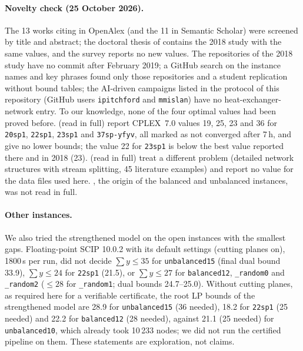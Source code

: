 \documentclass[11pt,a4paper]{report}
\newcommand*{\inst}[1]{\texttt{#1}}
\begin{document}
\paragraph{Novelty check (25 October 2026).} The 13 works citing \textcite{LKM2018} in OpenAlex (and the 11 in
Semantic Scholar) were screened by title and abstract; the doctoral thesis of \textcite{Kouyialis2019} contains the
2018 study with the same values, and the survey \textcite{Letsios2020} reports no new values. The repositories of the
2018 study have no commit after February 2019; a GitHub search on the instance names and key phrases found only
those repositories and a student replication without bound tables; the AI-driven campaigns listed in the protocol of
this repository (GitHub users \texttt{ipitchford} and \texttt{mmislan}) have no heat-exchanger-network entry. To our
knowledge, none of the four optimal values had been proved before. \textcite{FurmanSahinidis2004} (read in full)
report CPLEX~7.0 values 19, 25, 23 and 36 for \inst{20sp1}, \inst{22sp1}, \inst{23sp1} and \inst{37sp-yfyv}, all
marked as not converged after 7\,h, and give no lower bounds; the value 22 for \inst{23sp1} is below the best value
reported there and in 2018 (23). \textcite{CerdaCafaro2022} (read in full) treat a different problem (detailed network
structures with stream splitting, 45 literature examples) and report no value for the data files used here.
\textcite{ChenGrossmannMiller2015}, the origin of the balanced and unbalanced instances, was not read in full.

\paragraph{Other instances.} We also tried the strengthened model on the open instances with the smallest gaps.
Floating-point SCIP 10.0.2 with its default settings (cutting planes on), 1800\,s per run, did not decide
$\sum y\le35$ for \inst{unbalanced15} (final dual bound 33.9), $\sum y\le24$ for \inst{22sp1} (21.5), or
$\sum y\le27$ for \inst{balanced12}, \inst{\_random0} and \inst{\_random2} ($\le28$ for \inst{\_random1}; dual
bounds 24.7--25.0). Without cutting planes, as required here for a
verifiable certificate, the root LP bounds of the strengthened model are 28.9 for \inst{unbalanced15} (36 needed),
18.2 for \inst{22sp1} (25 needed) and 22.2 for \inst{balanced12} (28 needed), against 21.1 (25 needed) for
\inst{unbalanced10}, which already took 10\,233 nodes; we did not run the certified pipeline on them. These
statements are exploration, not claims.
\end{document}
